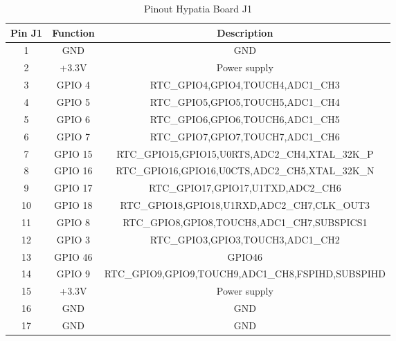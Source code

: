 \begin{table}[!h]
\begin{center}
\caption[Pinout Hypatia Board J1]{Pinout Hypatia Board J1 \cite[see][7]{SYDE:2024}}
\label{PinoutHypatiaJ1}
\begin{tabular}{|c|c|c|}
	\hline
	\textbf{Pin J1} &\textbf{Function}  & \textbf{Description} \\
	\hline
	1& GND  & GND  \\
	\hline
	2& +3.3V  & Power supply \\
	\hline
	3& GPIO 4 & RTC\_GPIO4,GPIO4,TOUCH4,ADC1\_CH3 \\
	\hline
	4& GPIO 5 & RTC\_GPIO5,GPIO5,TOUCH5,ADC1\_CH4 \\
	\hline
	5& GPIO 6 & RTC\_GPIO6,GPIO6,TOUCH6,ADC1\_CH5 \\
	\hline
	6& GPIO 7 & RTC\_GPIO7,GPIO7,TOUCH7,ADC1\_CH6 \\
	\hline
	7& GPIO 15 & RTC\_GPIO15,GPIO15,U0RTS,ADC2\_CH4,XTAL\_32K\_P \\
	\hline
	8& GPIO 16 & RTC\_GPIO16,GPIO16,U0CTS,ADC2\_CH5,XTAL\_32K\_N \\
	\hline
	9& GPIO 17 & RTC\_GPIO17,GPIO17,U1TXD,ADC2\_CH6 \\
	\hline
	10& GPIO 18 & RTC\_GPIO18,GPIO18,U1RXD,ADC2\_CH7,CLK\_OUT3 \\
	\hline
	11& GPIO 8 & RTC\_GPIO8,GPIO8,TOUCH8,ADC1\_CH7,SUBSPICS1 \\
	\hline
	12& GPIO 3 & RTC\_GPIO3,GPIO3,TOUCH3,ADC1\_CH2 \\
	\hline
	13& GPIO 46 & GPIO46\\
	\hline
	14& GPIO 9 & RTC\_GPIO9,GPIO9,TOUCH9,ADC1\_CH8,FSPIHD,SUBSPIHD \\
	\hline
	15& +3.3V  & Power supply \\
	\hline
	16& GND  & GND  \\
	\hline
	17& GND  & GND  \\
	\hline
	\end{tabular}
	\end{center}
	\end{table}
	
